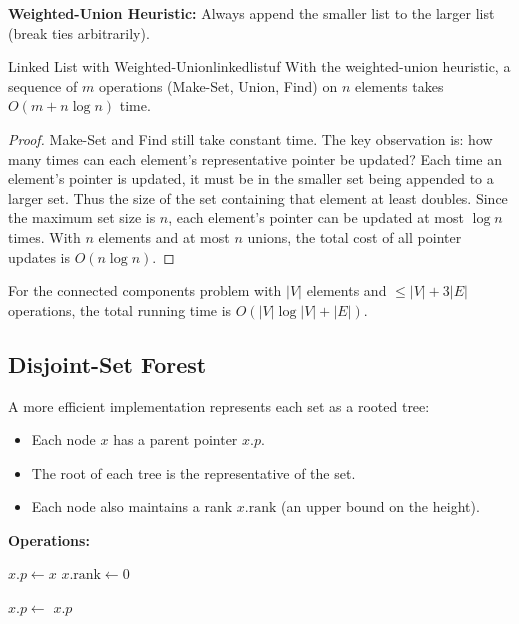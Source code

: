 \textbf{Weighted-Union Heuristic:} Always append the smaller list to the larger list (break ties arbitrarily).

\begin{theorem}{Linked List with Weighted-Union}{linkedlistuf}
With the weighted-union heuristic, a sequence of $m$ operations (Make-Set, Union, Find) on 
$n$ elements takes $O(m + n \log n)$ time.
\end{theorem}

\begin{proof}
Make-Set and Find still take constant time. The key observation is: how many times can each 
element's representative pointer be updated? Each time an element's pointer is updated, it must 
be in the smaller set being appended to a larger set. Thus the size of the set containing that 
element at least doubles. Since the maximum set size is $n$, each element's pointer can be 
updated at most $\log n$ times. With $n$ elements and at most $n$ unions, the total cost of 
all pointer updates is $O(n \log n)$.
\end{proof}

For the connected components problem with $|V|$ elements and $\le |V| + 3|E|$ operations, 
the total running time is $O(|V| \log |V| + |E|)$.

\subsection{Disjoint-Set Forest}

A more efficient implementation represents each set as a rooted tree:
\begin{itemize}[noitemsep]
  \item Each node $x$ has a parent pointer $x.p$.
  \item The root of each tree is the representative of the set.
  \item Each node also maintains a rank $x.\text{rank}$ (an upper bound on the height).
\end{itemize}

\textbf{Operations:}

\begin{algorithm}[H]
\caption{Make-Set and Find-Set}
\begin{algorithmic}[1]
  \State $x.p \gets x$
  \State $x.\text{rank} \gets 0$
\EndProcedure
\end{algorithmic}
\begin{algorithmic}[1]
    \State $x.p \gets$  
  \EndIf
  \State \Return $x.p$
\EndProcedure
\end{algorithmic}
\end{algorithm}


